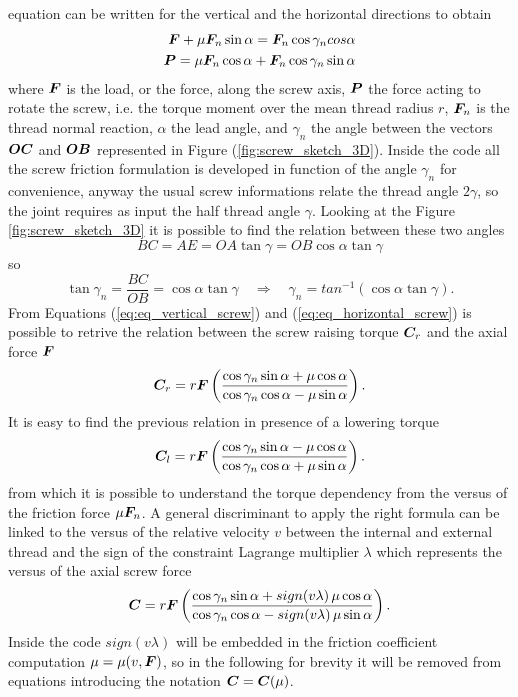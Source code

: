 equation can be written for the vertical and the horizontal directions to obtain
\begin{align}
  \bm{F}+\mu\bm{F}_n \sin{\alpha}=\bm{F}_n \cos{\gamma_n}cos{\alpha}
  \label{eq:eq_vertical_screw}
  \\
  \bm{P} = \mu\bm{F}_n\cos{\alpha} + \bm{F}_n\cos{\gamma_n}\sin{\alpha}
  \label{eq:eq_horizontal_screw}
\end{align}
where $\bm{F}$ is the load, or the force, along the screw axis, $\bm{P}$ the force acting to
rotate the screw, i.e. the torque moment over the mean thread radius $r$,
$\bm{F}_n$ is the thread normal reaction, $\alpha$ the lead angle, 
and $\gamma_n$ the angle between the vectors $\bm{OC}$ and $\bm{OB}$ 
represented in Figure (\ref{fig:screw_sketch_3D}). 
Inside the code all the screw friction formulation is developed in function of the angle
$\gamma_n$ for convenience, anyway the usual screw informations relate the thread angle
$2\gamma$, so the joint requires as input the half thread angle $\gamma$. Looking at the Figure 
\ref{fig:screw_sketch_3D} it is possible to find the relation between these two angles
\begin{equation}
BC=AE=OA\tan{\gamma}=OB\cos{\alpha}\tan{\gamma}
\end{equation}
so
\begin{equation}
  \tan{\gamma_n}=\frac{BC}{OB}=\cos{\alpha}\tan{\gamma}
  \quad \Rightarrow \quad  
  \gamma_n=tan^{-1}(\cos{\alpha}\tan{\gamma}).
\end{equation}
From Equations 
(\ref{eq:eq_vertical_screw}) and (\ref{eq:eq_horizontal_screw}) is possible to retrive
the relation between the screw raising torque $\bm{C}_r$ and the axial force $\bm{F}$
\begin{equation}
  \bm{C}_r=r\bm{F}\left(\frac{\cos{\gamma_n}\sin{\alpha}+\mu\cos{\alpha}}
  {\cos{\gamma_n}\cos{\alpha}-\mu\sin{\alpha}}\right).
  \label{eq:raising_torque}
\end{equation}
It is easy to find the previous relation in presence of a lowering torque
\begin{equation}
  \bm{C}_l=r\bm{F}\left(\frac{\cos{\gamma_n}\sin{\alpha}-\mu\cos{\alpha}}
  {\cos{\gamma_n}\cos{\alpha}+\mu\sin{\alpha}}\right).
  \label{eq:lowering_torque}
\end{equation}
from which it is possible to understand the torque dependency from the
versus of the friction force $\mu\bm{F}_n$. A general discriminant to apply
the right formula can be linked to the versus of the relative velocity $v$ 
between the internal and external thread and the sign of the constraint 
Lagrange multiplier $\lambda$ which represents the versus of the axial screw force
\begin{equation}
  \bm{C}=r\bm{F}\left(\frac{\cos{\gamma_n}\sin{\alpha}+sign(v\lambda)\,\mu\cos{\alpha}}
  {\cos{\gamma_n}\cos{\alpha}-sign(v\lambda)\,\mu\sin{\alpha}}\right).
  \label{eq:torque}
\end{equation}
Inside the code $sign(v\lambda)$ will be embedded in the friction coefficient 
computation $\mu=\mu(v, \bm{F})$, so in the following for brevity it will be removed
from equations introducing the notation $\bm{C}=\bm{C}(\mu)$.

